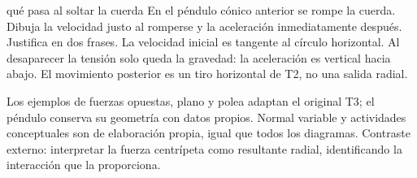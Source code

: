 \documentclass[11pt,a4paper]{article}
\begin{document}
\begin{exercisebox}{qu\'e pasa al soltar la cuerda}
En el p\'endulo c\'onico anterior se rompe la cuerda. Dibuja la velocidad justo al
romperse y la aceleraci\'on inmediatamente despu\'es. Justifica en dos frases.
\solutionblock
La velocidad inicial es tangente al c\'irculo horizontal. Al desaparecer la
tensi\'on solo queda la gravedad: la aceleraci\'on es vertical hacia abajo.
El movimiento posterior es un tiro horizontal de T2, no una salida radial.
\end{exercisebox}

Los ejemplos de fuerzas opuestas, plano y polea adaptan el original T3;
el p\'endulo conserva su geometr\'ia con datos propios. Normal variable y
actividades conceptuales son de elaboraci\'on propia, igual que todos los diagramas.
Contraste externo: interpretar la fuerza centr\'ipeta como resultante radial,
identificando la interacci\'on que la proporciona.
\end{document}
